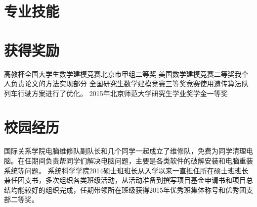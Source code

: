 \documentclass[11pt,a4paper]{moderncv}
\begin{document}
\section{专业技能}

\section{获得奖励} %
{高教杯全国大学生数学建模竞赛北京市甲组二等奖}{}{}{}{}
{美国数学建模竞赛二等奖}{}{}{}{我个人负责论文的方法实现部分}
{全国研究生数学建模竞赛三等奖}{}{}{}{竞赛使用遗传算法队列车行驶方案进行了优化。}
{2015年北京师范大学研究生学业奖学金一等奖}{}{}{}{}

\section{校园经历} %
{国际关系学院电脑维修队副队长}{}{}{}{和几个同学一起成立了维修队，免费为同学清理电脑。在任期间负责帮同学们解决电脑问题，主要是各类软件的破解安装和电脑重装系统等问题。}
{系统科学学院2014硕士班班长}{}{}{}{从入学以来一直担任所在硕士班班长兼任团支书，多次组织各类班级活动，从活动准备到撰写项目基金申请书和项目总结均能较好的组织完成，任期带领所在班级获得2015年优秀班集体称号和优秀团支部二等奖。}

\closesection{}                   %
\renewcommand{\listitemsymbol}{-} %
\end{document}
